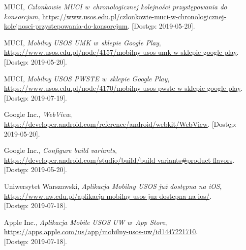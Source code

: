 \documentclass{pracamgr}
\begin{document}
\begin{thebibliography}{99}
 MUCI, \textit{Członkowie MUCI w~chronologicznej kolejności przystępowania do konsorcjum}, \url{https://www.usos.edu.pl/czlonkowie-muci-w-chronologicznej-kolejnosci-przystepowania-do-konsorcjum}. [Dostęp: 2019-05-20].

 MUCI, \textit{Mobilny USOS UMK w~sklepie Google Play}, \url{https://www.usos.edu.pl/node/4157/mobilny-usos-umk-w-sklepie-google-play}. [Dostęp: 2019-05-20].

 MUCI, \textit{Mobilny USOS PWSTE w~sklepie Google Play}, \url{https://www.usos.edu.pl/node/4170/mobilny-usos-pwste-w-sklepie-google-play}. [Dostęp: 2019-07-19].

 Google Inc., \textit{WebView}, \url{https://developer.android.com/reference/android/webkit/WebView}. [Dostęp: 2019-05-20].

 Google Inc., \textit{Configure build variants}, \url{https://developer.android.com/studio/build/build-variants#product-flavors}. [Dostęp: 2019-05-20].

 Uniwersytet Warszawski,
\textit{Aplikacja Mobilny USOS już dostępna na iOS},\\
\url{https://www.uw.edu.pl/aplikacja-mobilny-usos-juz-dostepna-na-ios/}.\\
{[Dostęp: 2019-07-18]}.

 Apple Inc.,
\textit{Aplikacja Mobile USOS UW w~App Store},\\
\url{https://apps.apple.com/us/app/mobilny-usos-uw/id1447221710}.\\
{[Dostęp: 2019-07-18]}.

\end{thebibliography}
\end{document}
